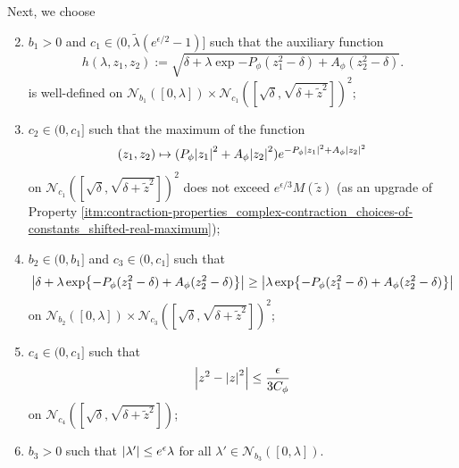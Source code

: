 \documentclass[11pt]{article}
\newcommand{\tl}{\tilde{\lambda}}
\newcommand{\tz}{\tilde{z}}
\newcommand{\aconst}{A_{\phi}}
\newcommand{\pconst}{P_{\phi}}
\numberwithin{equation}{section}
\theoremstyle{plain}
\theoremstyle{definition}
\theoremstyle{remark}
\begin{document}
Next, we choose
\begin{enumerate}[label=(\roman*)]
\setcounter{enumi}{1}
\item $b_{1}>0$ and $c_{1}\in(0,\tl(e^{\epsilon/2}-1)]$ such that the auxiliary function 
\begin{equation}
h(\lambda,z_{1},z_{2}):=\sqrt{\delta+\lambda \exp{-\pconst (z_{1}^{2}-\delta)+\aconst (z_{2}^{2}-\delta)}}.
\end{equation}
is well-defined on $\mathcal{N}_{b_{1}}([0,\lambda])\times\mathcal{N}_{c_{1}}([\sqrt{\delta},\sqrt{\delta+\tz^{2}}])^{2}$;
\label{itm:contraction-properties_complex-contraction_choices-of-constants_well-definedness}
\item $c_{2}\in(0,c_{1}]$ such that the maximum of the function
\begin{equation}
(z_{1},z_{2})\mapsto(\pconst \abs{z_{1}}^{2}+\aconst \abs{z_{2}}^{2})e^{-\pconst \abs{z_{1}}^{2}+\aconst \abs{z_{2}}^{2}}
\end{equation}
on $\mathcal{N}_{c_{1}}([\sqrt{\delta},\sqrt{\delta+\tz^{2}}])^{2}$ does not exceed $e^{\epsilon/3}M(\tz)$ (as an upgrade of Property \ref{itm:contraction-properties_complex-contraction_choices-of-constants_shifted-real-maximum});
\label{itm:contraction-properties_complex-contraction_choices-of-constants_shifted-complex-maximum}
\item $b_{2}\in(0,b_{1}]$ and $c_{3}\in(0,c_{1}]$ such that
\begin{equation}
\abs{\delta+\lambda \exp{-\pconst (z_{1}^{2}-\delta)+\aconst (z_{2}^{2}-\delta)}}
\ge\abs{\lambda\exp{-\pconst(z_{1}^{2}-\delta)+\aconst(z_{2}^{2}-\delta)}}
\end{equation}
on $\mathcal{N}_{b_{2}}([0,\lambda])\times\mathcal{N}_{c_{3}}([\sqrt{\delta},\sqrt{\delta+\tz^{2}}])^{2}$;
\label{itm:contraction-properties_complex-contraction_choices-of-constants_remove-shift}
\item $c_{4}\in(0,c_{1}]$ such that 
\begin{equation}
\abs{z^{2}-\abs{z}^{2}}\le\frac{\epsilon}{3C_{\phi}}
\end{equation}
on $\mathcal{N}_{c_{4}}([\sqrt{\delta},\sqrt{\delta+\tz^{2}}])$;
\label{itm:contraction-properties_complex-contraction_choices-of-constants_square}
\item $b_{3}>0$ such that $\abs{\lambda'}\le e^{\epsilon}\lambda$ for all $\lambda'\in\mathcal{N}_{b_{3}}([0,\lambda])$.
\label{itm:contraction-properties_complex-contraction_choices-of-constants_activity-modulus}
\end{enumerate}
\end{document}
